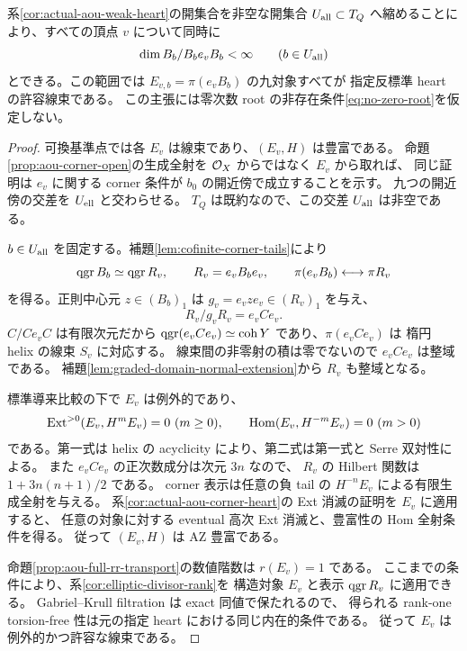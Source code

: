 \begin{proposition}
\label{prop:aou-all-corner-lines}
系\ref{cor:actual-aou-weak-heart}の開集合を非空な開集合
$U_{\rm all}\subset T_Q$ へ縮めることにより、すべての頂点 $v$ について同時に
\[
 \dim B_b/B_be_vB_b<\infty\qquad(b\in U_{\rm all})
\]
とできる。この範囲では $E_{v,b}=\pi(e_vB_b)$ の九対象すべてが
指定反標準 heart の許容線束である。
この主張には零次数 root の非存在条件\eqref{eq:no-zero-root}を仮定しない。
\end{proposition}
\begin{proof}
可換基準点では各 $E_v$ は線束であり、$(E_v,H)$ は豊富である。
命題\ref{prop:aou-corner-open}の生成全射を $\mathcal O_X$ からではなく $E_v$ から取れば、
同じ証明は $e_v$ に関する corner 条件が $b_0$ の開近傍で成立することを示す。
九つの開近傍の交差を $U_{\rm ell}$ と交わらせる。
$T_Q$ は既約なので、この交差 $U_{\rm all}$ は非空である。

$b\in U_{\rm all}$ を固定する。補題\ref{lem:cofinite-corner-tails}により
\[
 \operatorname{qgr} B_b\simeq\operatorname{qgr} R_v,\qquad
 R_v=e_vB_be_v,
 \qquad \pi(e_vB_b)\longleftrightarrow\pi R_v
\]
を得る。正則中心元 $z\in(B_b)_1$ は $g_v=e_vze_v\in(R_v)_1$ を与え、
\[
 R_v/g_vR_v=e_vCe_v.
\]
$C/Ce_vC$ は有限次元だから
$\operatorname{qgr}(e_vCe_v)\simeq\operatorname{coh}Y$ であり、$\pi(e_vCe_v)$ は
楕円 helix の線束 $S_v$ に対応する。
線束間の非零射の積は零でないので $e_vCe_v$ は整域である。
補題\ref{lem:graded-domain-normal-extension}から $R_v$ も整域となる。

標準導来比較の下で $E_v$ は例外的であり、
\[
 \operatorname{Ext}^{>0}(E_v,H^mE_v)=0\ (m\ge0),\qquad
 \operatorname{Hom}(E_v,H^{-m}E_v)=0\ (m>0)
\]
である。第一式は helix の acyclicity により、第二式は第一式と Serre 双対性による。
また $e_vCe_v$ の正次数成分は次元 $3n$ なので、
$R_v$ の Hilbert 関数は $1+3n(n+1)/2$ である。
corner 表示は任意の負 tail の $H^{-n}E_v$ による有限生成全射を与える。
系\ref{cor:actual-aou-corner-heart}の Ext 消滅の証明を $E_v$ に適用すると、
任意の対象に対する eventual 高次 Ext 消滅と、豊富性の Hom 全射条件を得る。
従って $(E_v,H)$ は AZ 豊富である。

命題\ref{prop:aou-full-rr-transport}の数値階数は $r(E_v)=1$ である。
ここまでの条件により、系\ref{cor:elliptic-divisor-rank}を
構造対象 $E_v$ と表示 $\operatorname{qgr} R_v$ に適用できる。
Gabriel--Krull filtration は exact 同値で保たれるので、
得られる rank-one torsion-free 性は元の指定 heart における同じ内在的条件である。
従って $E_v$ は例外的かつ許容な線束である。
\end{proof}

